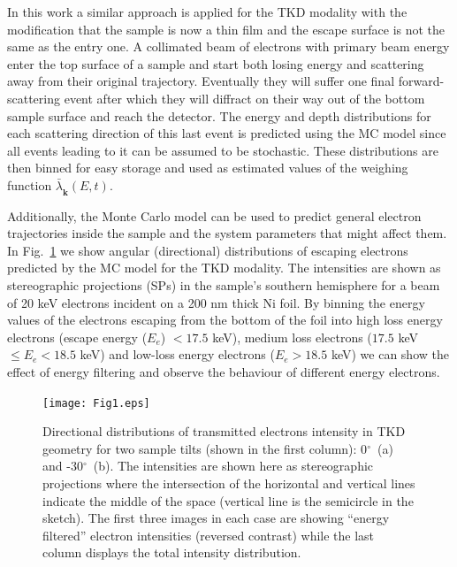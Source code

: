 In this work a similar approach is applied for the TKD modality with the modification that the sample is now a thin film and the escape surface is not the same as the entry one. A collimated beam of electrons with primary beam energy enter the top surface of a sample and start both losing energy and scattering away from their original trajectory. Eventually they will suffer one final forward-scattering event after which they will diffract on their way out of the bottom sample surface and reach the detector. The energy and depth distributions for each scattering direction of this last event is predicted using the MC model since all events leading to it can be assumed to be stochastic. These distributions are then binned for easy storage and used as estimated values of the weighing function $\bar{\lambda}_{\hat{\mathbf{k}}}(E,t)$.


Additionally, the Monte Carlo model can be used to predict general electron trajectories inside the sample and the system parameters that might affect them. In Fig.~\ref{fig:SP_TKD} we show angular (directional) distributions of escaping electrons predicted by the MC model for the TKD modality. The intensities are shown as stereographic projections (SPs) in the sample's southern hemisphere for a beam of 20 keV electrons incident on a 200 nm thick Ni foil. By binning the energy values of the electrons escaping from the bottom of the foil into high loss energy electrons (escape energy ($E_e$) $<17.5$ keV), medium loss electrons ($17.5$ keV $\leqslant E_e < 18.5$ keV) and low-loss energy electrons ($E_e>18.5$ keV) we can show the effect of energy filtering and observe the behaviour of different energy electrons. 



\begin{figure}[ht]
\centering\leavevmode
\texttt{[image: Fig1.eps]} %
\caption[Directional distributions of transmitted electrons intensity in TKD geometry.]{Directional distributions of transmitted electrons intensity in TKD geometry for two sample tilts (shown in the first column): 0$^{\circ}$~(a) and -30$^{\circ}$~(b). The intensities are shown here as stereographic projections where the intersection of the horizontal and vertical lines indicate the middle of the space (vertical line is the semicircle in the sketch). The first three images in each case are showing  ``energy filtered'' electron intensities (reversed contrast) while the last column displays the total intensity distribution. } 
\label{fig:SP_TKD}
\end{figure}



